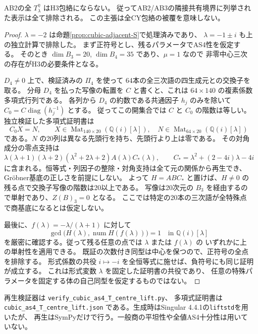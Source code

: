\begin{theorem}\label{thm:cubic-adjacent-T-all}
AB2の全 $T^\eta_\lambda$ はH3包絡にならない。
従ってAB2/AB3の隣接共有境界に列挙された表示は全て排除される。
この主張は全CY包絡の被覆を意味しない。
\end{theorem}
\begin{proof}
$\lambda=-2$ は命題\ref{prop:cubic-adjacent-S}で処理済みであり、
$\lambda=-1\pm i$ も上の独立計算で排除した。
まず正符号とし、残るパラメータでAS4性を仮定する。
そのとき $\dim B_3=20$, $\dim B_4=35$ であり、$\mu=1$ なので
非零中心三次の存在がH3の必要条件となる。

$D_4\ne0$ 上で、検証済みの $\Pi_4$ を使って
64本の全三次語の四生成元との交換子を取る。
分母 $D_4$ を払った写像の転置を $C$ と書くと、これは
$64\times140$ の複素係数多項式行列である。
各列から $D_4$ の約数である共通因子 $h_j$ のみを除いて
$C_0=C\operatorname{diag}(h_j^{-1})$ とする。
従ってこの開集合では $C$ と $C_0$ の階数は等しい。
独立検証した多項式証明書は
\[
 C_0X=N,\qquad X\in\operatorname{Mat}_{140\times20}(\mathbb Q(i)[\lambda]),
 \quad N\in\operatorname{Mat}_{64\times20}(\mathbb Q(i)[\lambda])
\]
である。$N$ の20列は異なる先頭行を持ち、先頭行より上は零である。
その対角成分の零点支持は
\[
 \lambda(\lambda+1)(\lambda+2)(\lambda^2+2\lambda+2)
 A(\lambda)C_*(\lambda),\qquad
 C_* =\lambda^2+(2-4i)\lambda-4i
\]
に含まれる。恒等式・列因子の整除・対角支持は全て元の関係から再生でき、
Gr\"obner基底の正しさを前提にしない。
よって $H=AB C_*$ と置けば、$H\ne0$ の残る点で交換子写像の階数は20以上である。
写像は20次元の $B_3$ を経由するので単射であり、$Z(B)_3=0$ となる。
ここでは特定の20本の三次語が全特殊点で商基底になるとは仮定しない。

最後に、$f(\lambda)=-\lambda/(\lambda+1)$ に対して
\[
 \gcd\bigl(H(\lambda),\operatorname{num}H(f(\lambda))\bigr)=1
 \quad\text{in }\mathbb Q(i)[\lambda]
\]
を厳密に確認する。従って残る任意の点では $\lambda$ または $f(\lambda)$ の
いずれかに上の単射性を適用できる。
既証の次数付き同型は中心を保つので、正符号の全点を排除する。
形式係数の共役 $i\mapsto-i$ を全恒等式に施せば、負符号にも同じ証明が成立する。
これは形式変数 $\lambda$ を固定した証明書の共役であり、
任意の特殊パラメータを固定する体の自己同型を仮定するものではない。
\end{proof}
再生検証器は
\texttt{verify\_\allowbreak{}cubic\_\allowbreak{}as4\_\allowbreak{}T\_\allowbreak{}centre\_\allowbreak{}lift.py}、
多項式証明書は
\texttt{cubic\_\allowbreak{}as4\_\allowbreak{}T\_\allowbreak{}centre\_\allowbreak{}lift.json}
である。生成時はSingular 4.4.1の\texttt{liftstd}を用いたが、
再生はSymPyだけで行う。一般商の平坦性や全値AS4十分性は用いていない。
